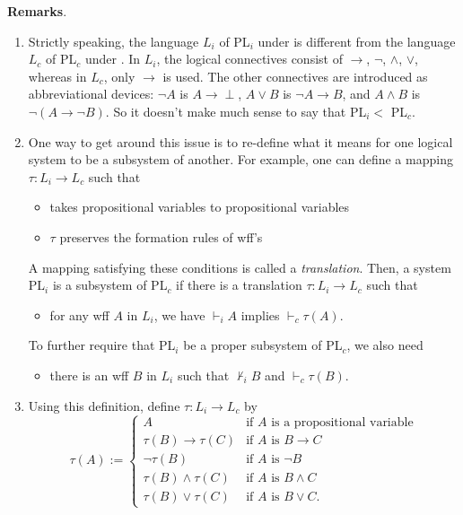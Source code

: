 \documentclass[12pt]{article}
\begin{document}
\textbf{Remarks}.  
\begin{enumerate}
\item
Strictly speaking, the language $L_i$ of PL$_i$ under  is different from the language $L_c$ of PL$_c$ under .  In $L_i$, the logical connectives consist of $\to$, $\neg$, $\land$, $\lor$, whereas in $L_c$, only $\to$ is used.  The other connectives are introduced as abbreviational devices: $\neg A$ is $A\to \perp$, $A\lor B$ is $\neg A \to B$, and $A\land B$ is $\neg (A\to \neg B)$.  So it doesn't make much sense to say that PL$_i < $ PL$_c$.  
\item One way to get around this issue is to re-define what it means for one logical system to be a subsystem of another.   For example, one can define a mapping $\tau: L_i \to L_c$ such that 
\begin{itemize}
\item takes propositional variables to propositional variables
\item $\tau$ preserves the formation rules of wff's
\end{itemize}
A mapping satisfying these conditions is called a \emph{translation}.  Then, a system PL$_i$ is a subsystem of PL$_c$ if there is a translation $\tau: L_i \to L_c$ such that 
\begin{itemize}
\item for any wff $A$ in $L_i$, we have $\vdash_i A$ implies $\vdash_c \tau(A)$.
\end{itemize}
To further require that PL$_i$ be a proper subsystem of PL$_c$, we also need
\begin{itemize}
\item there is an wff $B$ in $L_i$ such that $\not \vdash_i B$ and $\vdash_c \tau(B)$.
\end{itemize}
\item Using this definition, define $\tau: L_i \to L_c$ by
\begin{displaymath}
\tau(A):= \left\{
\begin{array}{ll}
A & \textrm{if $A$ is a propositional variable}\\
\tau(B)\to \tau(C) & \textrm{if $A$ is $B\to C$}\\
\neg \tau(B) & \textrm{if $A$ is $\neg B$}\\
\tau(B) \land \tau(C) & \textrm{if $A$ is $B\land C$}\\
\tau(B)\lor \tau(C)  & \textrm{if $A$ is $B\lor C$.}
\end{array}
\right.
\end{displaymath}

\end{enumerate}
\end{document}
